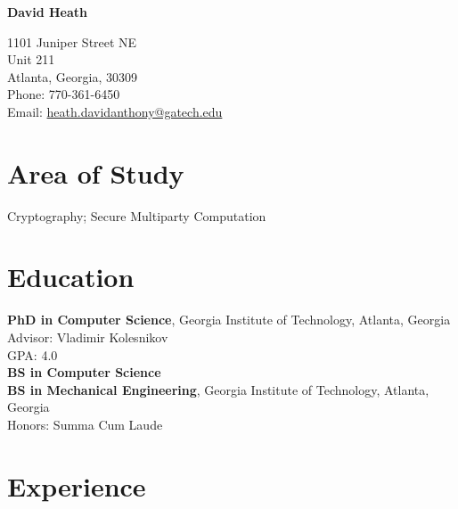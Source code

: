 \documentclass[11pt]{article}
\begin{document}
{\LARGE\bfseries David Heath}
\medskip\medskip

1101 Juniper Street NE\\
Unit 211\\
Atlanta, Georgia, 30309
\medskip\\
Phone: 770-361-6450\\
Email: \href{mailto:heath.davidanthony@gatech.edu}{heath.davidanthony@gatech.edu}

\section*{Area of Study}

Cryptography; Secure Multiparty Computation

\section*{Education}

\textbf{PhD in Computer Science}, Georgia Institute of Technology, Atlanta, Georgia\\
Advisor: Vladimir Kolesnikov\\
GPA: 4.0
\medskip\\
\textbf{BS in Computer Science}\\
\textbf{BS in Mechanical Engineering}, Georgia Institute of Technology, Atlanta, Georgia\\
Honors: Summa Cum Laude


\section*{Experience}
\end{document}
